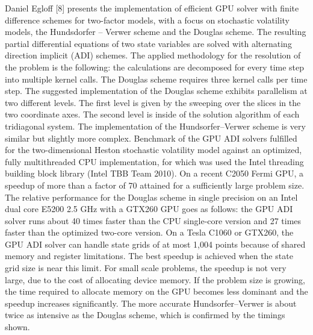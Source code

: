 Daniel Egloff [8] presents the implementation of efficient GPU solver with finite difference schemes for two-factor models, with a focus on stochastic volatility models, the Hundsdorfer – Verwer scheme and the Douglas scheme. The resulting partial differential equations of two state variables are solved with alternating direction implicit (ADI) schemes. The applied methodology for the resolution of the problem is the following: the calculations are decomposed for every time step into multiple kernel calls. The Douglas scheme requires three kernel calls per time step. The suggested implementation of the Douglas scheme exhibits parallelism at two different levels. The first level is given by the sweeping over the slices in the two coordinate axes. The second level is inside of the solution algorithm of each tridiagonal system. The implementation of the Hundsorfer–Verwer scheme is very similar but slightly more complex. Benchmark of the GPU ADI solvers fulfilled for the two-dimensional Heston stochastic volatility model against an optimized, fully multithreaded CPU implementation, for which was used the Intel threading building block library (Intel TBB Team 2010). On a recent C2050 Fermi GPU, a speedup of more than a factor of 70 attained for a sufficiently large problem size. The relative performance for the Douglas scheme in single precision on an Intel dual core E5200 2.5 GHz with a GTX260 GPU goes as follows: the GPU ADI solver runs about 40 times faster than the CPU single-core version and 27 times faster than the optimized two-core version. On a Tesla C1060 or GTX260, the GPU ADI solver can handle state grids of at most 1,004 points because of shared memory and register limitations. The best speedup is achieved when the state grid size is near this limit. For small scale problems, the speedup is not very large, due to the cost of allocating device memory. If the problem size is growing, the time required to allocate memory on the GPU becomes less dominant and the speedup increases significantly. The more accurate Hundsorfer–Verwer is about twice as intensive as the Douglas scheme, which is confirmed by the timings shown.


